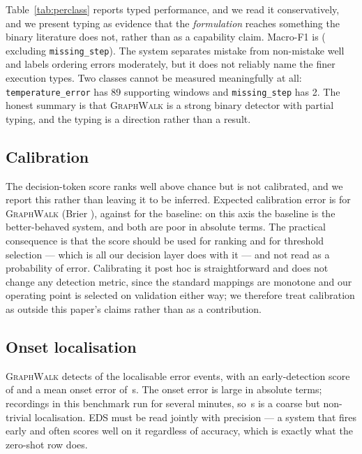 \documentclass[10pt,twocolumn]{article}
\newcommand{\ourmodel}{\textsc{GraphWalk}}
\begin{document}
Table~\ref{tab:perclass} reports typed performance, and we read it
conservatively, and we present typing as evidence that the \emph{formulation}
reaches something the binary literature does not, rather than as a capability
claim. Macro-F1 is \resMacro{} (\resMacroX{} excluding \texttt{missing\_step}).
The system separates mistake from non-mistake well and labels ordering errors
moderately, but it does not reliably name the finer execution types. Two classes cannot be measured meaningfully at all:
\texttt{temperature\_error} has 89 supporting windows and \texttt{missing\_step}
has 2. The honest summary is that \ourmodel{} is a strong binary detector with
partial typing, and the typing is a direction rather than a result.

\subsection{Calibration}

The decision-token score ranks well above chance but is not calibrated, and we
report this rather than leaving it to be inferred. Expected calibration error is
\resECE{} for \ourmodel{} (Brier \resBrier{}), against \baseECE{} for the
baseline: on this axis the baseline is the better-behaved system, and both are
poor in absolute terms. The practical consequence is that the score should be
used for ranking and for threshold selection --- which is all our decision layer
does with it --- and not read as a probability of error. Calibrating it post hoc
is straightforward and does not change any detection metric, since the standard
mappings are monotone and our operating point is selected on validation either
way; we therefore treat calibration as outside this paper's claims rather than
as a contribution.

\subsection{Onset localisation}

\ourmodel{} detects \resDet{} of the \resLoc{} localisable error events, with an
early-detection score of \resEDS{} and a mean onset error of \resMAE{}\,s. The
onset error is large in absolute terms; recordings in this benchmark run for
several minutes, so \resMAE{}\,s is a coarse but non-trivial localisation.
EDS must be read jointly with precision --- a system that fires early and often
scores well on it regardless of accuracy, which is exactly what the zero-shot row
does.
\end{document}
